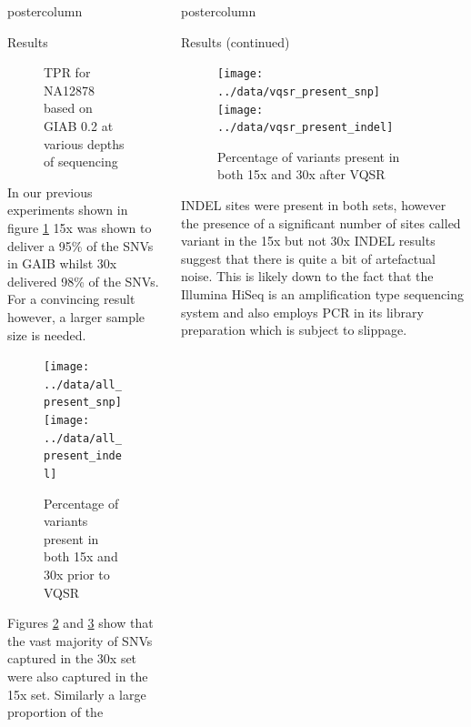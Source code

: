 \documentclass[final,xcolor=table]{beamer}
\begin{document}
\begin{frame}{}
\begin{columns}[t]
\begin{column}{.49\textwidth}
\begin{beamercolorbox}[center,wd=\textwidth]{postercolumn}
\begin{minipage}[T]{.95\textwidth}
\begin{block}{Results}
\begin{figure}
                \caption{TPR for NA12878 based on GIAB 0.2 at various depths of sequencing}
                \label{fig:na12878_ds}
                \end{figure}
{In our previous experiments\cite{bib:pollard} shown in figure \ref{fig:na12878_ds} 15x was shown to deliver a 95\% of the SNVs in GAIB whilst 30x delivered 98\% of the SNVs. For a convincing result however, a larger sample size is needed.}
                \begin{figure}
                \texttt{[image: ../data/all\_present\_snp]}
                \texttt{[image: ../data/all\_present\_indel]}
                \caption{Percentage of variants present in both 15x and 30x prior to VQSR}
                \label{fig:all_present}
                \end{figure}
{Figures \ref{fig:all_present} and \ref{fig:vqsr_present} show that the vast majority of SNVs captured in the 30x set were also captured in the 15x set. Similarly a large proportion of the}
            \end{block}
            \vfill

            \end{minipage}
        \end{beamercolorbox}
    \end{column}
    \begin{column}{.49\textwidth}
        \begin{beamercolorbox}[center,wd=\textwidth]{postercolumn}
            \begin{minipage}[T]{.95\textwidth}  %

            \begin{block}{Results (continued)}
                \begin{figure}
                \texttt{[image: ../data/vqsr\_present\_snp]}
                \texttt{[image: ../data/vqsr\_present\_indel]}
                \caption{Percentage of variants present in both 15x and 30x after VQSR}
                \label{fig:vqsr_present}
                \end{figure}

                {INDEL sites were present in both sets, however the presence of a significant number of sites called variant in the 15x but not 30x INDEL results suggest that there is quite a bit of artefactual noise. This is likely down to the fact that the Illumina HiSeq is an amplification type sequencing system and also employs PCR in its library preparation which is subject to slippage.}


\end{block}
\end{minipage}
\end{beamercolorbox}
\end{column}
\end{columns}
\end{frame}
\end{document}
